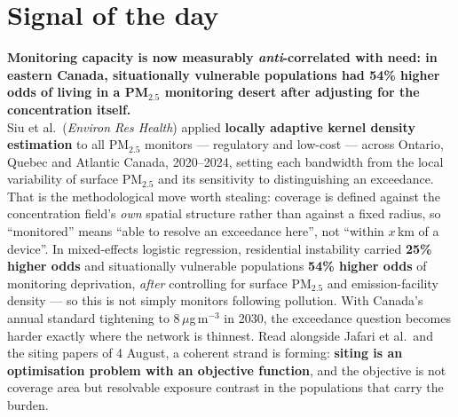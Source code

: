 \documentclass[10pt]{article}
\begin{document}
\vspace{6mm}

\section*{\sffamily\bfseries\color{Deep}Signal of the day}
\vspace{-1.5mm}{\color{Amber}\rule{\linewidth}{1.1pt}}\vspace{2.5mm}

\begin{keybox}
{\sffamily\bfseries\small\color{Deep}Monitoring capacity is now measurably
\emph{anti}-correlated with need: in eastern Canada, situationally vulnerable populations
had 54\% higher odds of living in a PM$_{2.5}$ monitoring desert after adjusting for the
concentration itself.}\\[1.4mm]
\footnotesize
Siu et al.\ (\textit{Environ Res Health}) applied \textbf{locally adaptive kernel density
estimation} to all PM$_{2.5}$ monitors --- regulatory and low-cost --- across Ontario,
Quebec and Atlantic Canada, 2020--2024, setting each bandwidth from the local variability
of surface PM$_{2.5}$ and its sensitivity to distinguishing an exceedance. That is the
methodological move worth stealing: coverage is defined against the concentration field's
\emph{own} spatial structure rather than against a fixed radius, so ``monitored'' means
``able to resolve an exceedance here'', not ``within $x$\,km of a device''. In
mixed-effects logistic regression, residential instability carried \textbf{25\% higher
odds} and situationally vulnerable populations \textbf{54\% higher odds} of monitoring
deprivation, \emph{after} controlling for surface PM$_{2.5}$ and emission-facility
density --- so this is not simply monitors following pollution. With Canada's annual
standard tightening to 8\,$\mu$g\,m$^{-3}$ in 2030, the exceedance question becomes
harder exactly where the network is thinnest. Read alongside Jafari et al.\ and the
siting papers of 4 August, a coherent strand is forming: \textbf{siting is an
optimisation problem with an objective function}, and the objective is not coverage area
but resolvable exposure contrast in the populations that carry the burden.
\end{keybox}

\vspace{3mm}

\end{document}

